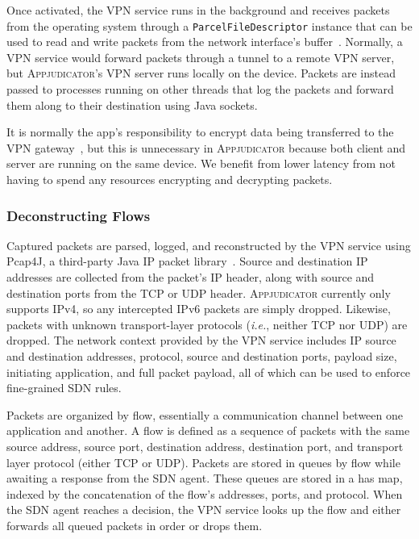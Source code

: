 Once activated, the VPN service runs in the background and receives packets from
the operating system through a \texttt{ParcelFileDescriptor} instance that can
be used to read and write packets from the network interface's
buffer~\cite{vpnguide}.  Normally, a VPN service would forward packets through a
tunnel to a remote VPN server, but \textsc{Appjudicator}'s VPN server runs
locally on the device.  Packets are instead passed to processes running on other
threads that log the packets and forward them along to their destination using
Java sockets.

It is normally the app's responsibility to encrypt data being transferred to the
VPN gateway~\cite{vpnguide}, but this is unnecessary in \textsc{Appjudicator}
because both client and server are running on the same device. We benefit from
lower latency from not having to spend any resources encrypting and decrypting
packets.

\subsubsection{Deconstructing Flows}
\label{sec:deconstructing-flows}

Captured packets are parsed, logged, and reconstructed by the VPN service using
Pcap4J, a third-party Java IP packet library~\cite{kaito2016}. Source and
destination IP addresses are collected from the packet's IP header, along with
source and destination ports from the TCP or UDP header. \textsc{Appjudicator}
currently only supports IPv4, so any intercepted IPv6 packets are simply
dropped. Likewise, packets with unknown transport-layer protocols
(\textit{i.e.}, neither TCP nor UDP) are dropped. The network context provided
by the VPN service includes IP source and destination addresses, protocol,
source and destination ports, payload size, initiating application, and full
packet payload, all of which can be used to enforce fine-grained SDN rules.


Packets are organized by flow, essentially a communication channel between one
application and another. A flow is defined as a sequence of packets with the
same source address, source port, destination address, destination port, and
transport layer protocol (either TCP or UDP). Packets are stored in queues by
flow while awaiting a response from the SDN agent. These queues are stored in a
has map, indexed by the concatenation of the flow's addresses, ports, and
protocol. When the SDN agent reaches a decision, the VPN service looks up the
flow and either forwards all queued packets in order or drops them.

